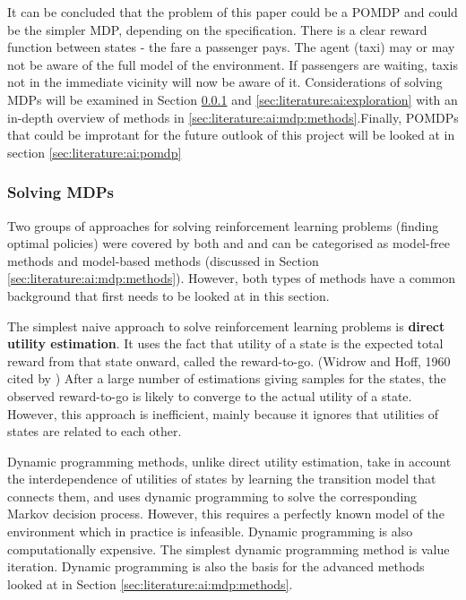 It can be concluded that the problem of this paper could be a POMDP and could
be the simpler MDP, depending on the specification. There is a clear reward
function between states - the fare a passenger pays. The agent (taxi) may or
may not be aware of the full model of the environment. If passengers are
waiting, taxis not in the immediate vicinity will now be aware of it.
Considerations of solving MDPs will be examined in Section
\ref{sec:literature:ai:mdp:solving} and \ref{sec:literature:ai:exploration}
with an in-depth overview of methods in
\ref{sec:literature:ai:mdp:methods}.Finally, POMDPs that could be improtant for
the future outlook of this project will be looked at in section
\ref{sec:literature:ai:pomdp}


\subsubsection{Solving MDPs}
\label{sec:literature:ai:mdp:solving}

Two groups of approaches for solving reinforcement learning problems (finding
optimal policies) were covered by both \textcite{Russell2010ai+modern} and
\textcite{Sutton1998ai+reinforcement} and can be categorised as model-free
methods and model-based methods (discussed in Section
\ref{sec:literature:ai:mdp:methods}). However, both types of methods have a
common background that first needs to be looked at in this section.

The simplest naive approach to solve reinforcement learning problems is
\textbf{direct utility estimation}. It uses the fact that utility of a state is
the expected total reward from that state onward, called the reward-to-go.
(Widrow and Hoff, 1960 cited by \textcite{Russell2010ai+modern}) After a large
number of estimations giving samples for the states, the observed reward-to-go
is likely to converge to the actual utility of a state. However, this approach
is inefficient, mainly because it ignores that utilities of states are related
to each other. \parencite{Russell2010ai+modern}

Dynamic programming methods, unlike direct utility estimation, take in account
the interdependence of utilities of states by learning the transition model
that connects them, and uses dynamic programming to solve the corresponding
Markov decision process. However, this requires a perfectly known model of the
environment which in practice is infeasible. Dynamic programming is also
computationally expensive. The simplest dynamic programming method is value
iteration. Dynamic programming is also the basis for the advanced methods
looked at in Section \ref{sec:literature:ai:mdp:methods}.
\parencite{Sutton1998ai+reinforcement}

